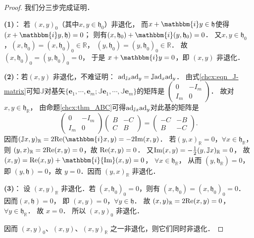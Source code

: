 \begin{proof}
我们分三步完成证明．

{\bfseries (1)}： 若 $(x, y)_0$（其中$x,y\in\mathfrak{h}_0$）非退化，
而$x+\mathbbm{i} y \in \mathfrak{h}$使得$(x+\mathbbm{i} y, \mathfrak{h})=0$；
则有$(x, \mathfrak{h}_0)+\mathbbm{i} (y, \mathfrak{h}_0)=0$．
又$x, y \in \mathfrak{h}_0$，$(x, \mathfrak{h}_0)= (x, \mathfrak{h}_0)_0 \in \mathbb{R}$，
$(y, \mathfrak{h}_0)=(y, \mathfrak{h}_0)_0 \in \mathbb{R}$． 
故$(x, \mathfrak{h}_0)_0=(y, \mathfrak{h}_0)_0=0$，
于是 $x+\mathbbm{i} y=0$，即 $(x, y)$ 非退化．

{\bfseries (2)}：若$(x, y)$ 非退化，不难证明：
${\rm ad}_{ \mathbb{J} x} {\rm ad}_y=\mathbb{J} {\rm ad}_x {\rm ad}_y$．
由式\eqref{chcx:eqn_J-matrix}可知$\mathbb{J}$对基矢$\{\boldsymbol{e}_1,\cdots,\boldsymbol{e}_m;
\mathbb{J}\boldsymbol{e}_1,\cdots,\mathbb{J}\boldsymbol{e}_m\}$的矩阵是
$    \left(\begin{smallmatrix}
    0& -I_m \\ I_m & 0
\end{smallmatrix}\right)$．
故对 $x, y \in \mathfrak{h}_{\mathbb{R}}$，
由命题\ref{chcx:thm_ABC}可得${\rm ad}_{ \mathbb{J} x} {\rm ad}_y$对此基的矩阵是
\begin{equation}
\left(\begin{array}{cc}
    0 & -I_m \\
    I_m & 0
\end{array}\right)\left(\begin{array}{cc}
    B & -C \\
    C & B
\end{array}\right)=\left(\begin{array}{cc}
    -C & -B \\
    B & -C
\end{array}\right) .
\end{equation}
因而$(\mathbb{J} x, y)_{\mathbb{R}}=2 {\rm Re}(\mathbbm{i} x, y)=-2 {\rm Im}(x, y)$．
若$(y, x)_{\mathbb{R}}=0$，$\forall x \in \mathfrak{h}_{\mathbb{R}}$，
则 $(y, x)_{\mathbb{R}}=2 {\rm Re}(x, y)=0$，故 ${\rm Re}(x, y)=0$．
又${\rm Im}(x, y)=-\frac{1}{2}(y, \mathbb{J} x)_{\mathbb{R}}=0$，
故 $(x, y)={\rm Re}(x, y)+ \mathbbm{i} {\rm Im}(x, y)=0$，
$\forall x \in \mathfrak{h}_{\mathbb{R}}$，
从而 $(y , \mathfrak{h}_{\mathbb{R}})=0$， 
即 $(y, \mathfrak{h})=0$，故 $y=0$．因而 $(y, x)_{\mathbb{R}}$ 非退化．

{\bfseries (3)}： 设 $(x, y)_{\mathbb{R}}$ 非退化．若 $(x, \mathfrak{h}_0)_0=0$，则有
$(x, \mathfrak{h}_0)=(x, \mathfrak{h}_0)_0=0 $．
因而$(x, \mathfrak{h})=0$， 即 $(x, y)=0$，$\forall y \in \mathfrak{h}$．
故 $(x, y)_{\mathbb{R}}=2 {\rm Re}(x, y)=0$，
$ \forall y \in \mathfrak{h}_{\mathbb{R}}$． 
故 $x=0$． 所以 $(x, y)_0$ 非退化．

因而 $(x, y)_0$、$(x, y)$、$(x, y)_{\mathbb{R}}$ 之一非退化，则它们同时非退化．
\end{proof}

